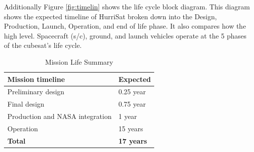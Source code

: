 Additionally Figure \ref{fig:timelin} shows the life cycle block diagram. This diagram shows the expected timeline of HurriSat broken down into the Design, Production, Launch, Operation, and end of life phase. It also compares how the high level. Spacecraft (s/c), ground, and launch vehicles operate at the 5 phases of the cubesat's life cycle. \\
\FloatBarrier
\begin{table}[hbt!]
\centering
\caption{ Mission Life Summary}
\begin{tabular}{ll}
\rowcolor[HTML]{C0C0C0} 
Mission timeline                &   Expected                \\ \hline
Preliminary design              & 0.25 year         \\
Final design                    & 0.75 year         \\
Production and NASA integration & 1 year            \\
Operation                       & 15 years          \\ \hline
\textbf{Total}                  & \textbf{17 years}
\end{tabular}
\label{Tab:clt}
\end{table}

